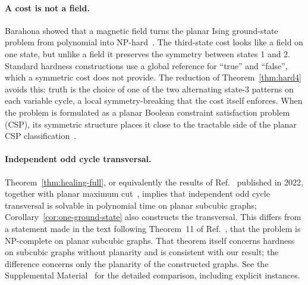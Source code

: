 \documentclass[aps,pre,twocolumn,floatfix,10pt]{revtex4-2}
\theoremstyle{definition}
\theoremstyle{remark}
\begin{document}
\paragraph*{A cost is not a field.} Barahona showed that a magnetic field turns the planar Ising
ground-state problem from polynomial into NP-hard~\cite{Barahona1982}. The third-state cost looks
like a field on one state, but unlike a field it preserves the symmetry between states 1 and 2.
Standard hardness constructions use a global reference for ``true'' and ``false'', which a
symmetric cost does not provide. The reduction of Theorem~\ref{thm:hard4} avoids this: truth is
the choice of one of the two alternating state-3 patterns on each variable cycle, a local
symmetry-breaking that the cost itself enforces. When the problem is formulated as a planar
Boolean constraint satisfaction problem (CSP), its symmetric structure places it close to the
tractable side of the planar CSP classification~\cite{KazdaKolmogorovRolinek2018,FullaZivny2017}.

\paragraph*{Independent odd cycle transversal.} Theorem~\ref{thm:healing-full}, or equivalently
the results of Ref.~\cite{Akbari2022} published in 2022, together with planar maximum
cut~\cite{Hadlock1975}, implies that independent odd cycle transversal is solvable in polynomial
time on planar subcubic graphs; Corollary~\ref{cor:one-ground-state} also constructs the
transversal. This differs from a statement made in the text following Theorem~11 of Ref.~\cite{Johnson2025}, that
the problem is NP-complete on planar subcubic graphs. That theorem itself concerns hardness on
subcubic graphs without planarity and is consistent with our result; the difference concerns only
the planarity of the constructed graphs. See the Supplemental Material~\cite{SM} for the detailed
comparison, including explicit instances.
\end{document}
